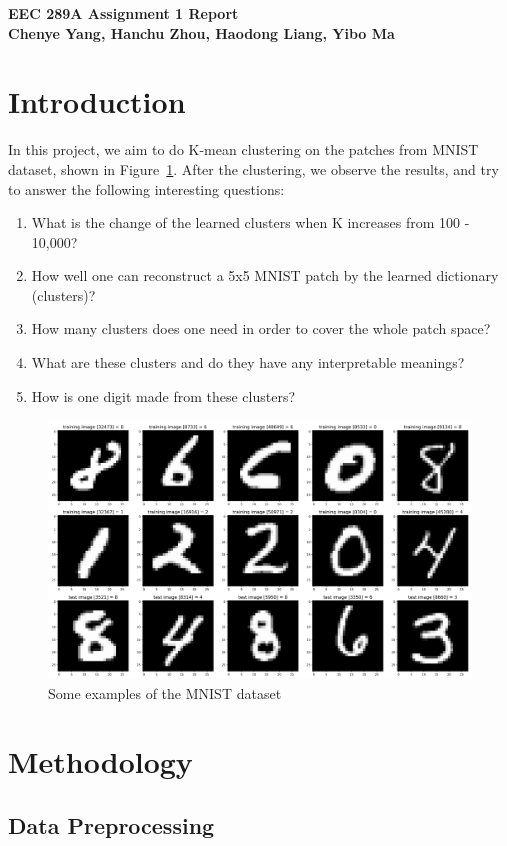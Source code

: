 \documentclass{article}
\begin{document}
\noindent
\textbf{\large EEC 289A Assignment 1 Report} \\
\textbf{\small Chenye Yang, Hanchu Zhou, Haodong Liang, Yibo Ma}



\section{Introduction}

In this project, we aim to do K-mean clustering on the patches from MNIST dataset, shown in Figure~\ref{fig:mnist}. After the clustering, we observe the results, and try to answer the following interesting questions:
\begin{enumerate}
    \item What is the change of the learned clusters when K increases from 100 - 10,000?
    \item How well one can reconstruct a 5x5 MNIST patch by the learned dictionary (clusters)?
    \item How many clusters does one need in order to cover the whole patch space?
    \item What are these clusters and do they have any interpretable meanings?
    \item How is one digit made from these clusters?
\end{enumerate}

\begin{figure}[htbp!]
    \centering
    \includegraphics[width = 0.6 \textwidth]{../Result/mnist_images.png}
    \caption{Some examples of the MNIST dataset}
    \label{fig:mnist}
\end{figure}


\section{Methodology}
\subsection{Data Preprocessing}
\end{document}
